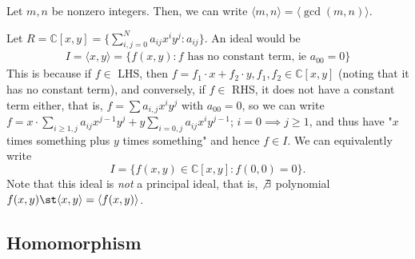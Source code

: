 \documentclass[12pt,oneside]{article}
\begin{document}
\begin{example}
  Let $m, n$ be nonzero integers. Then, we can write $\langle m, n\rangle = \langle \gcd (m,n)\rangle$.
\end{example}
\begin{example}
  Let $R = \mathbb{C}[x, y] = \{
  \sum_{i,j=0}^{N} a_{ij}x^iy^j : a_{ij}
  \}$. An ideal would be \begin{align*}
    I = \langle x, y\rangle = \{
      f(x,y) : f \text{ has no constant term, ie } a_{00} = 0
    \}
  \end{align*}
  This is because if $f \in $ LHS, then $f = f_1 \cdot x + f_2 \cdot y, f_1 , f_2 \in \mathbb{C}[x,y]$ (noting that it has no constant term), and conversely, if $f \in $ RHS, it does not have a constant term either, that is, $f = \sum a_{i,j} x^i y^j$ with $a_{00} = 0$, so we can write $f = x \cdot \sum_{i \geq 1,j} a_{ij} x^{j-1} y^{j} + y\sum_{i = 0,j} a_{ij} x^i y^{j-1}$; $i = 0 \implies j \geq 1$, and thus have "$x$ times something plus $y$ times something" and hence $f \in I$. We can equivalently write \[
  I = \{f(x,y) \in \mathbb{C}[x,y] : f(0,0) = 0\}.  
  \]
  Note that this ideal is \emph{not} a principal ideal, that is, $\not \exists$ polynomial $f(x,y) \st \langle x,y \rangle = \langle f(x,y)\rangle$. %
\end{example}

\subsection{Homomorphism}
\end{document}

